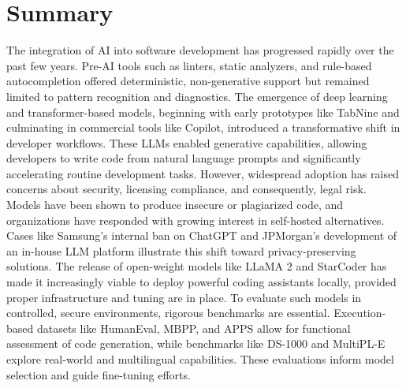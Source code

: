 \section{Summary}
\label{sec:summary}
The integration of \gls{AI} into software development has progressed rapidly over the past few years. Pre-AI tools such as linters, static analyzers, and rule-based autocompletion offered deterministic, non-generative support but remained limited to pattern recognition and diagnostics. The emergence of deep learning and transformer-based models, beginning with early prototypes like TabNine and culminating in commercial tools like Copilot, introduced a transformative shift in developer workflows. These \glspl{LLM} enabled generative capabilities, allowing developers to write code from natural language prompts and significantly accelerating routine development tasks. However, widespread adoption has raised concerns about security, licensing compliance, and consequently, legal risk. Models have been shown to produce insecure or plagiarized code, and organizations have responded with growing interest in self-hosted alternatives. Cases like Samsung’s internal ban on ChatGPT and JPMorgan’s development of an in-house \gls{LLM} platform illustrate this shift toward privacy-preserving solutions. The release of open-weight models like LLaMA 2 and StarCoder has made it increasingly viable to deploy powerful coding assistants locally, provided proper infrastructure and tuning are in place. To evaluate such models in controlled, secure environments, rigorous benchmarks are essential. Execution-based datasets like HumanEval, \gls{MBPP}, and \gls{APPS} allow for functional assessment of code generation, while benchmarks like DS-1000  and MultiPL-E explore real-world and multilingual capabilities. These evaluations inform model selection and guide fine-tuning efforts.

